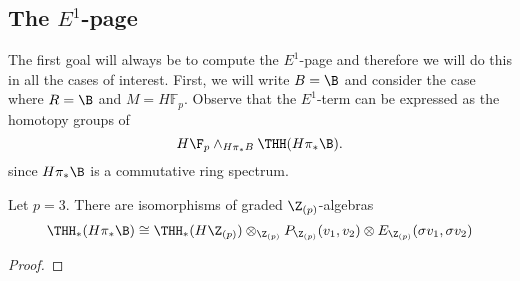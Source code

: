 \subsection{The $E^1$-page}
The first goal will always be to compute the $E^1$-page and therefore we will do this in all the cases of interest. First, we will write $B=\B$ and consider the case where $R=\B$ and $M=H\mathbb{F}_p$. Observe that the $E^1$-term can be expressed as the homotopy groups of
\[ 
H\F_p\wedge_{H\pi_*B}\THH(H\pi_*\B).
\]
since $H\pi_*\B$ is a commutative ring spectrum. 

\begin{comment}
First, we recall from \cite[Lurie Rotational invariance]{qx} that we can build an $E_{2}$-spectrum $\bbS[x]$ with homotopy groups $\pi_*\bbS[x]\cong \pi_*(\bbS)[x]$ where $|x|=2d$ as the Thom spectrum of a map 
\[ \N \to \Z \simeq \Omega^{2}BU(1)\to \Omega^{2}BU\simeq \Omega^{2d}BU\overset{\beta^{2d}}{\longrightarrow}BU\times \mathbb{Z}.\]
We then construct an $E_2$-ring $\bbS[v_1,v_2]$ where $\bbS[v_1]$ is constructed as above and then $\bbS[v_1,v_2]$ is then constructed by the same construction as $\bbS[v_2]$, but in in $\bbS[v_1]$-modules. We can then do the same construction in $H\Z_p$-modules and we observe that, there is an equivalence of $E_2$-algebras
\[
H\pi_*\B\simeq  H\Z_p\wedge \bbS[v_1,v_2].
\]
\gabe{Proving this may be harder than I originally thought. I think it is still very possible using machinery of Lurie. Do we need it to be an equivalence as $E_2$-algebras or just $E_1$-algebras? $E_1$-algebras should be much easier.}
\end{comment}
\begin{prop}
Let $p=3$. There are isomorphisms of graded $\Z_{(p)}$-algebras
\[
\THH_*(H\pi_*\B) \cong  \THH_*(H\Z_{(p)})\otimes_{\Z_{(p)}} P_{\Z_{(p)}}(v_1,v_2)\otimes E_{\Z_{(p)}}(\sigma v_1,\sigma v_2)
\]
\end{prop}
\begin{proof}
\end{proof}
